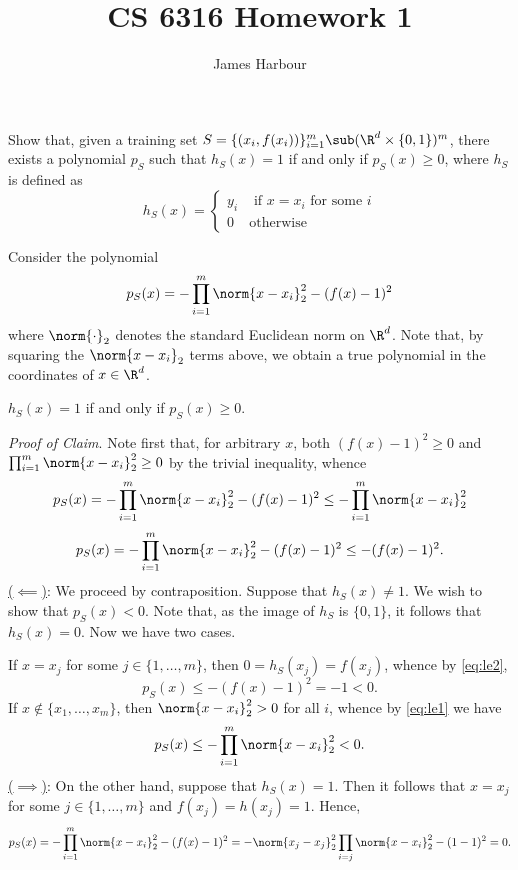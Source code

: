 \documentclass[12pt]{article}
\title{CS 6316 Homework 1}
\author{James Harbour}
\begin{document}
\maketitle

\begin{homeworkProblem}
  Show that, given a training set $ S = \{(x_{i}, f(x_{i}))\}_{i=1}^{m}\sub (\R^{d}\times\{0,1\})^{m} $, there exists a polynomial $ p_{S} $ such that $ h_{S}(x) = 1 $ if and only if $ p_{S}(x) \geq 0 $, where $ h_{S} $ is defined as
  \[
    h_{S}(x) = \begin{cases} y_{i} & \text{ if }x = x_{i} \text{ for some }i\\
    0 & \text{otherwise} \end{cases}
  \]
\end{homeworkProblem}

\begin{solution}
  Consider the polynomial 
  \[
    p_{S}(x) = -\prod_{i=1}^{m} \norm{x-x_{i}}_{2}^2 - (f(x)-1)^2 
  \]
  where $ \norm{\cdot}_{2} $ denotes the standard Euclidean norm on $ \R^{d} $. Note that, by squaring the $ \norm{x-x_{i}}_{2} $ terms above, we obtain a true polynomial in the coordinates of $ x\in \R^{d} $.

  \begin{claim}
    $ h_{S}(x)=1 $ if and only if $ p_{S}(x) \geq 0 $.
  \end{claim}
  \textit{Proof of Claim}.
    Note first that, for arbitrary $ x $, both $ (f(x)-1)^{2}\geq 0 $ and $ \prod_{i=1}^{m}\norm{x-x_{i}}_{2}^{2} \geq0 $ by the trivial inequality, whence 
    \begin{equation}\label{eq:le1}
      p_{S}(x) = -\prod_{i=1}^{m} \norm{x-x_{i}}_{2}^2 - (f(x)-1)^2 \leq -\prod_{i=1}^{m}\norm{x-x_{i}}_{2}^{2} 
    \end{equation}
    \begin{equation}\label{eq:le2}
      p_{S}(x) = -\prod_{i=1}^{m} \norm{x-x_{i}}_{2}^2 - (f(x)-1)^2 \leq - (f(x)-1)^2. 
    \end{equation}
    \underline{($ \impliedby$)}: We proceed by contraposition. Suppose that $ h_{S}(x)\neq1 $. We wish to show that $ p_{S}(x)<0 $. Note that, as the image of $ h_{S} $ is $ \{0,1\} $, it follows that $ h_{S}(x) = 0 $. Now we have two cases.

    If $ x=x_{j} $ for some $ j\in \{1,\ldots,m\} $, then $ 0 = h_{S}(x_{j}) = f(x_{j}) $, whence by \eqref{eq:le2},
    \[
      p_{S}(x) \leq -(f(x)-1)^{2}=-1 < 0.
    \]
    If $ x\not\in\{x_{1},\ldots,x_{m}\} $, then $ \norm{x-x_{i}}_{2}^{2} > 0 $ for all $ i $, whence by \eqref{eq:le1} we have
    \[
      p_{S}(x)\leq -\prod_{i=1}^{m}\norm{x-x_{i}}_{2}^{2} < 0.
    \]
 \underline{($ \implies $)}:
  On the other hand, suppose that $ h_{S}(x) = 1 $. Then it follows that $ x=x_{j} $ for some $ j\in\{1,\ldots, m\} $ and $ f(x_{j}) = h(x_{j})= 1 $. Hence, 
  \[
    p_{S}(x) = -\prod_{i=1}^{m} \norm{x-x_{i}}_{2}^2 - (f(x)-1)^2 = -\norm{x_{j}-x_{j}}_{2}^{2}\prod_{i=j} \norm{x-x_{i}}_{2}^2 - (1-1)^2  = 0.
  \]
  
\end{solution}
\end{document}
